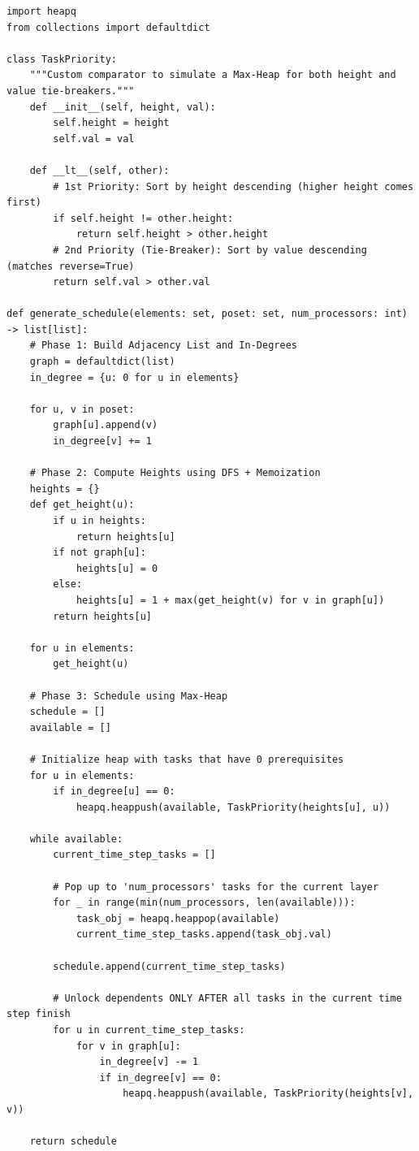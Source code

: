 \documentclass{article}
\begin{document}
\begin{tcolorbox}[enhanced, breakable, title=Optimal Approach,
    colframe=green!50!black,colback=green!10!white,
    arc=1mm,colbacktitle=green!10!white,
    fonttitle=\bfseries,coltitle=green!50!black,
    attach boxed title to top center=
    {yshift=-2mm,yshifttext=-1mm},
    boxed title style={
    interior style={fill=none,
    top color=green!30!white,
    bottom color=green!20!white}}]
    \begin{lstlisting}[belowskip=-10pt]
import heapq
from collections import defaultdict

class TaskPriority:
    """Custom comparator to simulate a Max-Heap for both height and value tie-breakers."""
    def __init__(self, height, val):
        self.height = height
        self.val = val
        
    def __lt__(self, other):
        # 1st Priority: Sort by height descending (higher height comes first)
        if self.height != other.height:
            return self.height > other.height
        # 2nd Priority (Tie-Breaker): Sort by value descending (matches reverse=True)
        return self.val > other.val

def generate_schedule(elements: set, poset: set, num_processors: int) -> list[list]:
    # Phase 1: Build Adjacency List and In-Degrees
    graph = defaultdict(list)
    in_degree = {u: 0 for u in elements}

    for u, v in poset:
        graph[u].append(v)
        in_degree[v] += 1

    # Phase 2: Compute Heights using DFS + Memoization
    heights = {}
    def get_height(u):
        if u in heights:
            return heights[u]
        if not graph[u]:
            heights[u] = 0
        else:
            heights[u] = 1 + max(get_height(v) for v in graph[u])
        return heights[u]

    for u in elements:
        get_height(u)

    # Phase 3: Schedule using Max-Heap
    schedule = []
    available = []
    
    # Initialize heap with tasks that have 0 prerequisites
    for u in elements:
        if in_degree[u] == 0:
            heapq.heappush(available, TaskPriority(heights[u], u))

    while available:
        current_time_step_tasks = []
        
        # Pop up to 'num_processors' tasks for the current layer
        for _ in range(min(num_processors, len(available))):
            task_obj = heapq.heappop(available)
            current_time_step_tasks.append(task_obj.val)
            
        schedule.append(current_time_step_tasks)
        
        # Unlock dependents ONLY AFTER all tasks in the current time step finish
        for u in current_time_step_tasks:
            for v in graph[u]:
                in_degree[v] -= 1
                if in_degree[v] == 0:
                    heapq.heappush(available, TaskPriority(heights[v], v))
                    
    return schedule
    \end{lstlisting}
\end{tcolorbox}
\end{document}
